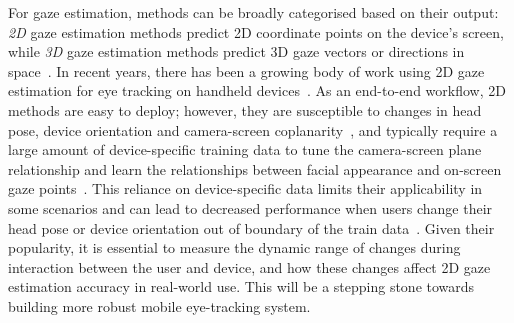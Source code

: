 For gaze estimation, methods can be broadly categorised based on their output: \textit{2D} gaze estimation methods predict 2D coordinate points on the device's screen, while \textit{3D} gaze estimation methods predict 3D gaze vectors or directions in space~\cite{sugano2014learning, zhang18revisiting,cheng2024benchmark}. In recent years, there has been a growing body of work using 2D gaze estimation for eye tracking on handheld devices~\cite{krafka2016eye, arakawa2022rgbdgaze, huynh2021imon, valliappan2020accelerating}. As an end-to-end workflow, 2D methods are easy to deploy; however, they are susceptible to changes in head pose, device orientation and camera-screen coplanarity~\cite{huang2017tabletgaze,krafka2016eye}, and typically require a large amount of device-specific training data to tune the camera-screen plane relationship and learn the relationships between facial appearance and on-screen gaze points~\cite{bace2019accurate}. This reliance on device-specific data limits their applicability in some scenarios and can lead to decreased performance when users change their head pose or device orientation out of boundary of the train data~\cite{balim2023efe, lei2023DynamicRead}. Given their popularity, it is essential to measure the dynamic range of changes during interaction between the user and device, and how these changes affect 2D gaze estimation accuracy in real-world use. This will be a stepping stone towards building more robust mobile eye-tracking system.


